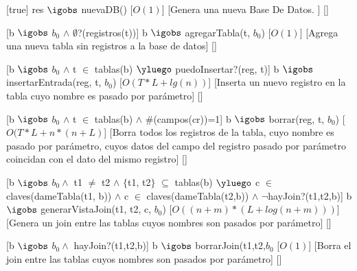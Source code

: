 \begin{Interfaz}
    
    
    
    
    [true]%
    {res $\igobs$ nuevaDB()}%
    [$O(1)$]%
    [Genera una nueva Base De Datos. ]%
    []%
    
    [b $\igobs$ $b_{0}$ $\land$ $\emptyset$?(registros(t))]%
    {b $\igobs$ agregarTabla(t, $b_{0}$)}%
    [$O(1)$]%
    [Agrega una nueva tabla sin registros a la base de datos]%
    []%
    
    [b $\igobs$ $b_{0}$ $\land$ t $\in$ tablas(b) $\yluego$ puedoInsertar?(reg, t)]%
    {b $\igobs$ insertarEntrada(reg, t, $b_{0}$)}%
    [$O(T*L + lg(n))$]%
    [Inserta un nuevo registro en la tabla cuyo nombre es pasado por par\'ametro]%
    []%
    
    [b $\igobs$ $b_{0}$ $\land$ t $\in$ tablas(b) $\land$ \#(campos(cr))=1]%
    {b $\igobs$ borrar(reg, t, $b_{0}$)}%
    [$O(T*L + n *(n + L)$]%
    [Borra todos los registros de la tabla, cuyo nombre es pasado por par\'ametro, cuyos datos del campo del registro pasado por par\'ametro coincidan con el dato del mismo registro]%
	[]%
    
    [b $\igobs$ $b_{0} \land$ t1 $\neq$ t2 $\land$ $\lbrace$t1, t2$\rbrace$ $\subseteq$ tablas(b) $\yluego$ c $\in$ claves(dameTabla(t1, b)) $\land$ c $\in$ claves(dameTabla(t2,b)) $\land$ $\lnot$hayJoin?(t1,t2,b)]%
    {b $\igobs$ generarVistaJoin(t1, t2, c, $b_{0}$)}%
    [$O((n+m)*(L + log(n + m)))$]%
    [Genera un join entre las tablas cuyos nombres son pasados por par\'ametro]%
    []%
  
    [b $\igobs$ $b_{0} \land$ hayJoin?(t1,t2,b)]%
    {b $\igobs$ borrarJoin(t1,t2,$b_{0}$}%
    [$O(1)$]%
    [Borra el join entre las tablas cuyos nombres son pasados por par\'ametro]%
    []%
  

\end{Interfaz}
